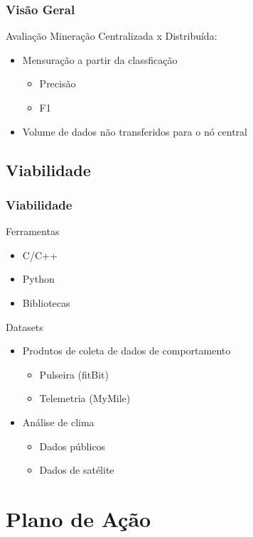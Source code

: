\documentclass[hyperref={pdfpagelabels=false}]{beamer}
\begin{document}
\begin{frame}
	\frametitle{Visão Geral}
    Avaliação Mineração Centralizada x Distribuída: \begin{itemize}
	    \item Mensuração a partir da classficação \begin{itemize}
	  	  \item Precisão
          \item F1
	    \end{itemize} 
        \item Volume de dados não transferidos para o nó central
	\end{itemize}
    
\end{frame}
       
\subsection{Viabilidade}  

\begin{frame}
	\frametitle{Viabilidade}
    
    \Large{Ferramentas}
    \normalsize
    \begin{itemize}
   		\item C/C++
		\item Python
        \item Bibliotecas 
    \end{itemize}
    \Large{Datasets}
    \normalsize
    \begin{itemize}
     	\item Produtos de coleta de dados de comportamento \begin{itemize}
        	\item Pulseira (fitBit)
        	\item Telemetria (MyMile)
        \end{itemize}
        \item Análise de clima \begin{itemize}
        	\item Dados públicos
            \item Dados de satélite
        \end{itemize}
    \end{itemize}
   
\end{frame}

\section{Plano de Ação}
\end{document}
